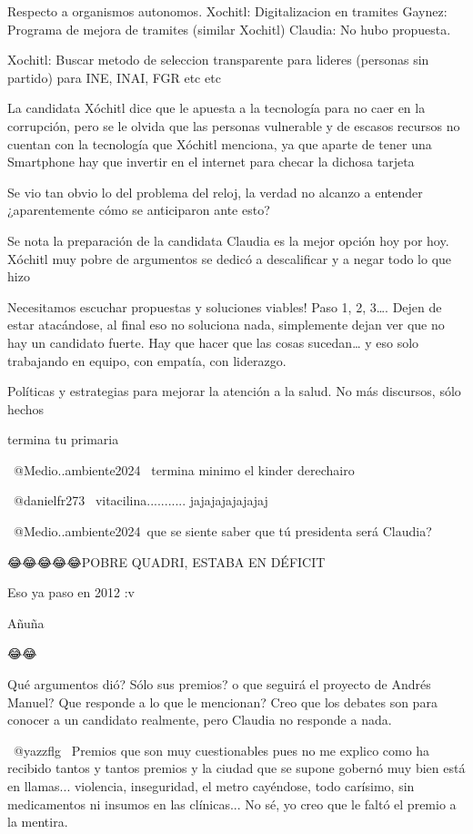 Respecto a organismos autonomos.
Xochitl: Digitalizacion en tramites 
Gaynez: Programa de mejora de tramites (similar Xochitl)
Claudia: No hubo propuesta.

Xochitl: Buscar metodo de seleccion transparente para lideres (personas sin partido) para INE, INAI, FGR etc etc

La candidata Xóchitl dice que le apuesta a la tecnología para no caer en la corrupción, pero se le olvida que las personas vulnerable y de escasos recursos no cuentan con la tecnología que Xóchitl menciona, ya que aparte de tener una Smartphone hay que invertir en el internet para checar la dichosa tarjeta

Se vio tan obvio lo del problema del reloj, la verdad no alcanzo a entender ¿aparentemente cómo se anticiparon ante esto?

Se nota la preparación de la candidata Claudia es la mejor opción hoy por hoy. Xóchitl muy pobre de argumentos se dedicó a descalificar y a negar todo lo que hizo

Necesitamos escuchar propuestas y soluciones viables! Paso 1, 2, 3…. Dejen de estar atacándose, al final eso no soluciona nada, simplemente dejan ver que no hay un candidato fuerte. Hay que hacer que las cosas sucedan… y eso solo trabajando en equipo, con empatía, con liderazgo.

Políticas y estrategias para mejorar la atención a la salud. No más discursos, sólo hechos

termina tu primaria

 @Medio..ambiente2024  termina minimo el kinder derechairo

 @danielfr273  vitacilina...........  jajajajajajajaj

​ @Medio..ambiente2024 que se siente saber que tú presidenta será Claudia?🤭

😂😂😂😂😂POBRE QUADRI, ESTABA EN DÉFICIT

Eso ya paso en 2012 :v

Añuña

😂😂

Qué argumentos dió? Sólo sus premios? o que seguirá el proyecto de Andrés Manuel? Que responde a lo que le mencionan? Creo que los debates son para conocer a un candidato realmente, pero Claudia no responde a nada.

 @yazzflg  Premios que son muy cuestionables pues no me explico como ha recibido tantos y tantos premios y la ciudad que se supone gobernó muy bien está en llamas... violencia, inseguridad, el metro cayéndose, todo carísimo, sin medicamentos ni insumos en las clínicas... No sé, yo creo que le faltó el premio a la mentira.

